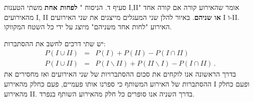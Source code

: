 \documentclass[12pt,a4paper]{article}
\begin{document}
סעיף ד. הניסוח "%
\textbf{לפחות אחת}
משתי הטענות I,II" אומר שהאירוע קורה אם קורה אחד מהאירועים I, II
\textbf{או שניהם}.
באיור להלן שני המעגלים מייצגים את שני האירועים I ו-II. האירוע "לחות אחד משניהם" מיוצג על ידי כל השטח המקווקו.
\begin{center}
\end{center}
 יש שתי דרכים לחשב את ההסתברות:
\begin{eqnarray*}
P(I \cup II) &=& P(I) + P(II) - P(I \cap II)\\
P(I \cup II) &=& P(I\backslash II) + P(II\backslash I) - P(I \cap II)\,.
\end{eqnarray*}
בדרך הראשונה אנו לוקחים את סכום ההסתברויות של שני האירועים ואז מחסירים את ההסתברות של האירוע המשותף כי ספרנו אותו פעמיים, פעם כחלק מהאירוע I ופעם כחלק מהאירוע II. בדרך השניה אנו סופרים כל חלק מהאירוע השותף בנפרד.
\end{document}

